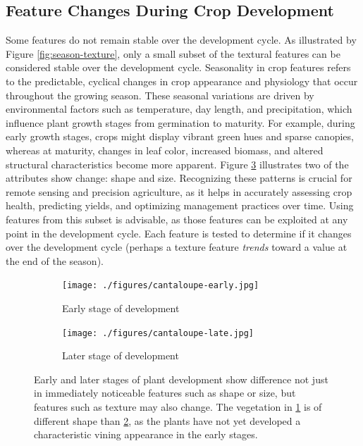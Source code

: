 \documentclass[letterpaper, notitlepage]{report}
\begin{document}
\subsection{Feature Changes During Crop Development}
Some features do not remain stable over the development cycle. As illustrated by Figure \ref{fig:season-texture}, only a small subset of the textural features can be considered stable over the development cycle. Seasonality in crop features refers to the predictable, cyclical changes in crop appearance and physiology that occur throughout the growing season. These seasonal variations are driven by environmental factors such as temperature, day length, and precipitation, which influence plant growth stages from germination to maturity. For example, during early growth stages, crops might display vibrant green hues and sparse canopies, whereas at maturity, changes in leaf color, increased biomass, and altered structural characteristics become more apparent. Figure \ref{fig:cantaloupe} illustrates two of the attributes show change: shape and size. Recognizing these patterns is crucial for remote sensing and precision agriculture, as it helps in accurately assessing crop health, predicting yields, and optimizing management practices over time. Using features from this subset is advisable, as those features can be exploited at any point in the development cycle.  Each feature is tested to determine if it changes over the development cycle (perhaps a texture feature \textit{trends} toward a value at the end of the season).

\begin{figure}[H]
	\centering
	\begin{subfigure}[h]{0.45\linewidth}
		\centering
		\texttt{[image: ./figures/cantaloupe-early.jpg]}
		\caption{Early stage of development}
		\label{subfig:cantaloupe-early}	
	\end{subfigure}
	\begin{subfigure}[h]{0.45\linewidth}
		\centering
		\texttt{[image: ./figures/cantaloupe-late.jpg]}
		\caption{Later stage of development}
		\label{subfig:cantaloupe-late}		
	\end{subfigure}%
	\caption[Early and later stages of vining plant development]{Early and later stages of plant development show difference not just in immediately noticeable features such as shape or size, but features such as texture may also change. The vegetation in \ref{subfig:cantaloupe-early} is of different shape  than \ref{subfig:cantaloupe-late}, as the plants have not yet developed a characteristic vining appearance in the early stages.}
	\label{fig:cantaloupe}
\end{figure}
%
\end{document}

